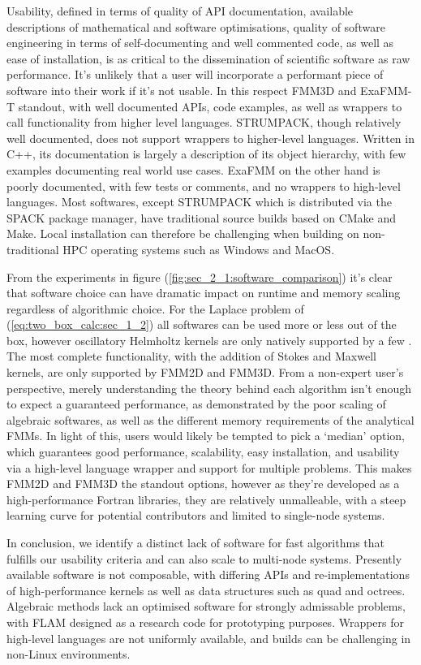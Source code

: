 Usability, defined in terms of quality of API documentation, available descriptions of mathematical and software optimisations,  quality of software engineering in terms of self-documenting and well commented code, as well as ease of installation, is as critical to the dissemination of scientific software as raw performance. It's unlikely that a user will incorporate a performant piece of software into their work if it's not usable. In this respect FMM3D and ExaFMM-T standout, with well documented APIs, code examples, as well as wrappers to call functionality from higher level languages. STRUMPACK, though relatively well documented, does not support wrappers to higher-level languages. Written in C++, its documentation is largely a description of its object hierarchy, with few examples documenting real world use cases. ExaFMM on the other hand is poorly documented, with few tests or comments, and no wrappers to high-level languages. Most softwares, except STRUMPACK which is distributed via the SPACK package manager, have traditional source builds based on CMake and Make. Local installation can therefore be challenging when building on non-traditional HPC operating systems such as Windows and MacOS.

From the experiments in figure (\ref{fig:sec_2_1:software_comparison}) it's clear that software choice can have dramatic impact on runtime and memory scaling regardless of algorithmic choice. For the Laplace problem of (\ref{eq:two_box_calc:sec_1_2}) all softwares can be used more or less out of the box, however oscillatory Helmholtz kernels are only natively supported by a few \cite{exafmm,wang2021exafmm,fmm2d, fmm3d}. The most complete functionality, with the addition of Stokes and Maxwell kernels, are only supported by FMM2D and FMM3D. From a non-expert user's perspective, merely understanding the theory behind each algorithm isn't enough to expect a guaranteed performance, as demonstrated by the poor scaling of algebraic softwares, as well as the different memory requirements of the analytical FMMs. In light of this, users would likely be tempted to pick a `median' option, which guarantees good performance, scalability, easy installation, and usability via a high-level language wrapper and support for multiple problems. This makes FMM2D and FMM3D the standout options, however as they're developed as a high-performance Fortran libraries, they are relatively unmalleable, with a steep learning curve for potential contributors and limited to single-node systems.

In conclusion, we identify a distinct lack of software for fast algorithms that fulfills our usability criteria and can also scale to multi-node systems. Presently available software is not composable, with differing APIs and re-implementations of high-performance kernels as well as data structures such as quad and octrees. Algebraic methods lack an optimised software for strongly admissable problems, with FLAM designed as a research code for prototyping purposes. Wrappers for high-level languages are not uniformly available, and builds can be challenging in non-Linux environments.

